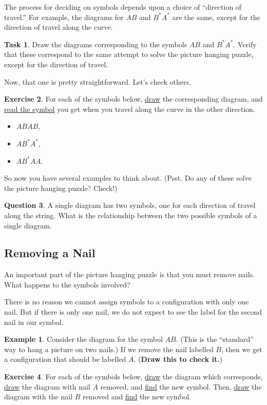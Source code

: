 \documentclass[12pt,letterpaper]{article}
\theoremstyle{definition}
\newtheorem{question}{Question}
\newtheorem{example}{Example}
\newtheorem{exercise}[question]{Exercise}
\newtheorem{task}[question]{Task}
\begin{document}
The process for deciding on symbols depends upon a choice of ``direction of travel.''
For example, the diagrams for $AB$ and $B^*A^*$ are the same, except for the direction of travel along the curve.
\begin{task}
Draw the diagrams corresponding to the symbols $AB$ and $B^*A^*$. Verify that these correspond to the same attempt to solve the picture hanging puzzle, except for the  direction of travel.
\end{task}
Now, that one is pretty straightforward.
Let's check others.
\begin{exercise}
For each of the symbols below, \underline{draw} the corresponding diagram, and \underline{read the symbol} you get when you travel along the curve in the other direction.
\begin{itemize}
\item $ABAB$,
\item $AB^*A^*$,
\item $AB^*AA$.
\end{itemize}
\end{exercise}
So now you have several examples to think about.
(Psst. Do any of these solve the picture hanging puzzle? Check!)

\begin{question}
A single diagram has two symbols, one for each direction of travel along the string.
What is the relationship between the two possible symbols of a single diagram.
\end{question}

\subsection*{Removing a Nail}

An important part of the picture hanging puzzle is that you must remove nails.
What happens to the symbols involved?

There is no reason we cannot assign symbols to a configuration with only one nail. But if there is only one nail, we do not expect to see the label for the second nail in our symbol.
\begin{example}
Consider the diagram for the symbol $AB$.
(This is the ``standard'' way to hang a picture on two nails.)
If we remove the nail labelled $B$, then we get a configuration that should be labelled $A$.
(\textbf{Draw this to check it.})
\end{example}

\begin{exercise}
For each of the symbols below, \underline{draw} the diagram which corresponds, \underline{draw} the diagram with nail $A$ removed, and \underline{find} the new symbol.
Then, \underline{draw} the diagram with the nail $B$ removed and \underline{find} the new symbol.
\end{exercise}
\end{document}

